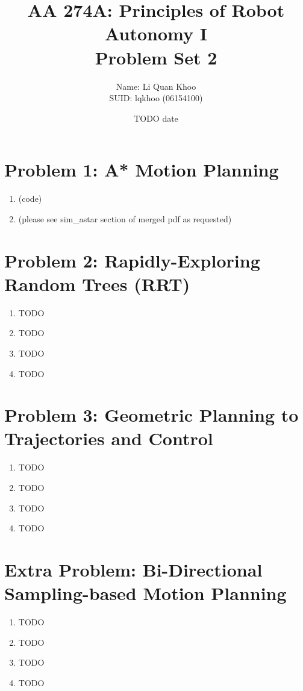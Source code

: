\documentclass{article}
\title{AA 274A: Principles of Robot Autonomy I \\ Problem Set 2}
\author{Name: Li Quan Khoo     \\ SUID: lqkhoo (06154100)}
\date{TODO date}
\begin{document}
\maketitle
\pagestyle{fancy} 

\section*{Problem 1: A* Motion Planning}
\begin{enumerate}[label=(\roman*)]
\item %
(code)

\item %
(please see sim\_astar section of merged pdf as requested)

\end{enumerate}


\section*{Problem 2: Rapidly-Exploring Random Trees (RRT)}
\begin{enumerate}[label=(\roman*)]
\item %
TODO

\item %
TODO

\item %
TODO

\item %
TODO

\end{enumerate}


\section*{Problem 3: Geometric Planning to Trajectories and Control}
\begin{enumerate}[label=(\roman*)]
\item %
TODO

\item %
TODO

\item %
TODO

\item %
TODO
	
\end{enumerate}


\section*{Extra Problem: Bi-Directional Sampling-based Motion Planning}
\begin{enumerate}[label=(\roman*)]
\item %
TODO

\item %
TODO

\item %
TODO

\item %
TODO
	
\end{enumerate}
\end{document}
